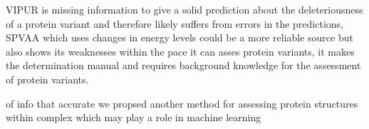 VIPUR is missing information to give a solid prediction about the deleteriousness of a protein variant and therefore likely suffers from errors in the predictions, SPVAA which uses changes in energy levels could be a more reliable source but also shows its weaknesses within the pace it can asses protein variants, it makes the determination manual and requires background knowledge for the assessment of protein variants. 

 of info that accurate we propsed another method for assessing protein structures within complex which may play a role in machine learning
 


